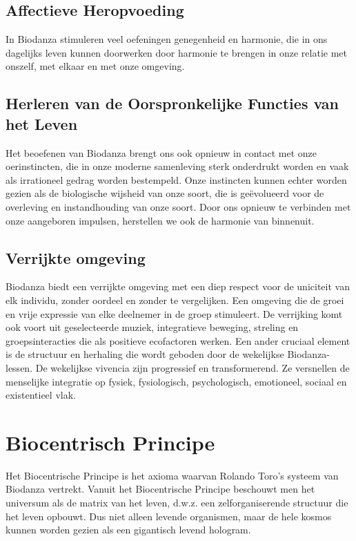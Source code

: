 \documentclass[
  11pt,
]{book}
\begin{document}
\subsection{Affectieve Heropvoeding}\label{affectieve-heropvoeding}

In Biodanza stimuleren veel oefeningen genegenheid en harmonie, die in ons dagelijks leven kunnen doorwerken door harmonie te brengen in onze relatie met onszelf, met elkaar en met onze omgeving.

\subsection{Herleren van de Oorspronkelijke Functies van het Leven}\label{herleren-van-de-oorspronkelijke-functies-van-het-leven}

Het beoefenen van Biodanza brengt ons ook opnieuw in contact met onze oerinstincten, die in onze moderne samenleving sterk onderdrukt worden en vaak als irrationeel gedrag worden bestempeld. Onze instincten kunnen echter worden gezien als de biologische wijsheid van onze soort, die is geëvolueerd voor de overleving en instandhouding van onze soort. Door ons opnieuw te verbinden met onze aangeboren impulsen, herstellen we ook de harmonie van binnenuit.

\subsection{Verrijkte omgeving}\label{verrijkte-omgeving}

Biodanza biedt een verrijkte omgeving met een diep respect voor de uniciteit van elk individu, zonder oordeel en zonder te vergelijken. Een omgeving die de groei en vrije expressie van elke deelnemer in de groep stimuleert. De verrijking komt ook voort uit geselecteerde muziek, integratieve beweging, streling en groepsinteracties die als positieve ecofactoren werken. Een ander cruciaal element is de structuur en herhaling die wordt geboden door de wekelijkse Biodanza-lessen. De wekelijkse vivencia zijn progressief en transformerend. Ze versnellen de menselijke integratie op fysiek, fysiologisch, psychologisch, emotioneel, sociaal en existentieel vlak.

\section{Biocentrisch Principe}\label{sectionBiocentricPrinciple}

Het Biocentrische Principe is het axioma waarvan Rolando Toro's systeem van Biodanza vertrekt. Vanuit het Biocentrische Principe beschouwt men het universum als de matrix van het leven, d.w.z. een zelforganiserende structuur die het leven opbouwt. Dus niet alleen levende organismen, maar de hele kosmos kunnen worden gezien als een gigantisch levend hologram.
\end{document}
